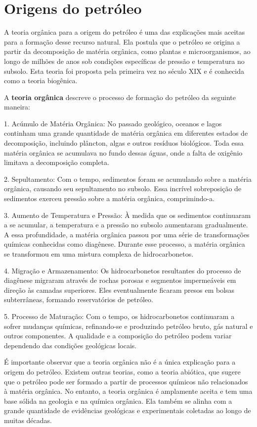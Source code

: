 \documentclass[a4paper,12pt]{book}
\begin{document}
\section{Origens do petróleo}
A teoria orgânica para a origem do petróleo é uma das explicações mais aceitas para a formação desse recurso natural. Ela postula que o petróleo se origina a partir da decomposição de matéria orgânica, como plantas e microorganismos, ao longo de milhões de anos sob condições específicas de pressão e temperatura no subsolo. Esta teoria foi proposta pela primeira vez no século XIX e é conhecida como a teoria biogênica.

A \textbf{teoria orgânica} descreve o processo de formação do petróleo da seguinte maneira:

1. Acúmulo de Matéria Orgânica: No passado geológico, oceanos e lagos continham uma grande quantidade de matéria orgânica em diferentes estados de decomposição, incluindo plâncton, algas e outros resíduos biológicos. Toda essa matéria orgânica se acumulava no fundo dessas águas, onde a falta de oxigênio limitava a decomposição completa.

2. Sepultamento: Com o tempo, sedimentos foram se acumulando sobre a matéria orgânica, causando seu sepultamento no subsolo. Essa incrível sobreposição de sedimentos exerceu pressão sobre a matéria orgânica, comprimindo-a.

3. Aumento de Temperatura e Pressão: À medida que os sedimentos continuaram a se acumular, a temperatura e a pressão no subsolo aumentaram gradualmente. A essa profundidade, a matéria orgânica passou por uma série de transformações químicas conhecidas como diagênese. Durante esse processo, a matéria orgânica se transformou em uma mistura complexa de hidrocarbonetos.

4. Migração e Armazenamento: Os hidrocarbonetos resultantes do processo de diagênese migraram através de rochas porosas e segmentos impermeáveis em direção às camadas superiores. Eles eventualmente ficaram presos em bolsas subterrâneas, formando reservatórios de petróleo.

5. Processo de Maturação: Com o tempo, os hidrocarbonetos continuaram a sofrer mudanças químicas, refinando-se e produzindo petróleo bruto, gás natural e outros componentes. A qualidade e a composição do petróleo podem variar dependendo das condições geológicas locais.

É importante observar que a teoria orgânica não é a única explicação para a origem do petróleo. Existem outras teorias, como a teoria abiótica, que sugere que o petróleo pode ser formado a partir de processos químicos não relacionados à matéria orgânica. No entanto, a teoria orgânica é amplamente aceita e tem uma base sólida na geologia e na química orgânica. Ela também se alinha com a grande quantidade de evidências geológicas e experimentais coletadas ao longo de muitas décadas.
\end{document}

